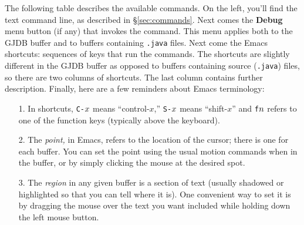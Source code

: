 \documentclass[11pt,twoside]{handout}
\begin{document}
The
following table describes the available commands.  On the left, you'll
find the text command line, as described in \S\ref{sec:commands}.  
Next comes the {\bf Debug} menu button (if any) that invokes the
command.  This menu applies both to the GJDB buffer and to buffers
containing {\tt.java} files.
Next come the Emacs shortcuts: sequences of keys that run the
commands.  The shortcuts are slightly different in the GJDB buffer as
opposed to buffers containing source ({\tt.java}) files, so there are
two columns of shortcuts.  The last column contains further description.
Finally, here are a few reminders about Emacs terminology:

\def\Menu#1{{\bf\footnotesize #1}}
\def\In#1{{\tt #1}}
\def\Key#1{{\tt #1}}

\begin{itemize}
\item[1.] In shortcuts, \Key{C-$x\/$} means ``control-$x$,''
\Key{S-$x\/$} means ``shift-$x$'' and \Key{f$n\/$} refers
to one of the function keys (typically above the keyboard).
\item[2.] The {\it point,\/} in Emacs, refers to the location of the
cursor; there is one for each buffer.  
You can set the point using the usual motion commands when in the
buffer, or by simply clicking the mouse at the desired spot.
\item[3.] The {\it region\/} in any given buffer is a section of text
(usually shadowed or highlighted so that you can tell where it is).
One convenient way to set it is by dragging 
the mouse over the text you want included while holding down the left
mouse button.
\end{itemize}

\newpage
\end{document}
